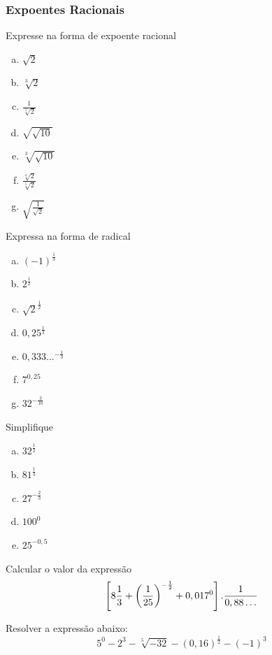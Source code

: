 \subsubsection{Expoentes Racionais}
\begin{exer}Expresse na forma de expoente racional
\begin{enumerate}[a)]
\item $\sqrt{2}$
\item $\sqrt[3]{2}$
\item $\frac{1}{\sqrt[5]{2}}$
\item $\sqrt{\sqrt{10}}$
\item $\sqrt[3]{\sqrt{10}}$
\item $\frac{\sqrt[4]{2}}{\sqrt[5]{2}}$
\item $\sqrt{\frac{1}{\sqrt{2}}}$
\end{enumerate}
\end{exer}
\begin{exer} Expressa na forma de radical
\begin{enumerate}[a)]
\item $(-1)^\frac{1}{3}$
\item $2^\frac{1}{2}$
\item $\sqrt{2}^\frac{1}{2}$
\item $0,25^\frac{1}{3}$
\item $0,333\ldots^{-\frac{1}{3}}$
\item $7^{0,25}$
\item $32^{-\frac{3}{10}}$
\end{enumerate}
\end{exer}
\begin{exer} Simplifique
\begin{enumerate}[a)]
\item $32^\frac{1}{2}$
\item $81^\frac{1}{3}$
\item $27^{-\frac{2}{3}}$
\item $100^0$
\item $25^{-0,5}$
\end{enumerate}
\end{exer}
\begin{exer}[CN] Calcular o valor da expressão $$\left[ 8\frac{1}{3} + \left ( \frac{1}{25} \right)^{-\frac{1}{2}} + 0,017^0 \right].\frac{1}{0,88\ldots}$$
\end{exer}
\begin{exer}[EsPCEx] Resolver a expressão abaixo: $$5^0-2^3-\sqrt[5]{-32}-(0,16)^\frac{1}{2}-(-1)^3$$
\end{exer}

